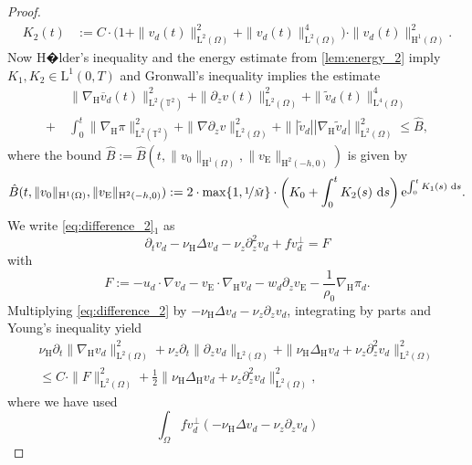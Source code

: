 \documentclass[preprint]{elsarticle}
\numberwithin{equation}{section}
\newcommand {\T}	{\mathbb{T}}
\renewcommand{\d}{\, \mathrm{d}}
\renewcommand{\H}{\mathrm{H}}
\newcommand{\dk}[1]{\partial_{#1}}
\newcommand{\dz}{\dk{z}}
\renewcommand{\bar}[1]{\overline{#1}}
\newcommand{\vbar}{\bar{v}}
\newcommand{\vtilde}{\tilde{v}}
\newcommand{\nablaH}{\nabla_{\H}}
\newcommand{\DeltaH}{\Delta_{\H}}
\newcommand{\rL}{\mathrm{L}}
\newcommand{\rH}{\H}
\newcommand{\rE}{\mathrm{E}}
\begin{document}
\begin{proof}
\begin{align*}
		K_2(t) &:= C \cdot \bigl(1+ \| v_d(t) \|_{\rL^2(\Omega)}^2 +\| v_d(t) \|_{\rL^2(\Omega)}^4\bigr) \cdot \| v_d(t) \|_{\rH^1(\Omega)}^2 .
	\end{align*}
	Now H�lder's inequality and the energy estimate from \autoref{lem:energy_2} imply $K_1, K_2 \in \rL^1(0,T)$ and Gronwall's inequality implies the estimate
	\begin{equation}
		\label{eq:bound_2}
		\begin{aligned}
			&\| \nablaH \vbar_d(t) \|_{\rL^2(\T^2)}^2
			+ \| \partial_z v(t) \|_{\rL^2(\Omega)}^2
			+ \| \vtilde_d(t) \|_{\rL^4(\Omega)}^4
			\\
			+ \
			&\int_0^t \| \nablaH \pi\|_{\rL^2(\T^2)}^2
			+ \| \nabla \partial_z v \|_{\rL^2(\Omega)}^2
			+ \| |\vtilde_d| |\nablaH \vtilde_d| \|_{\rL^2(\Omega)}^2 
			\leq \hat{B},  
		\end{aligned}
	\end{equation}
	where the bound $\hat{B} := \hat{B}(t,\| v_0 \|_{\rH^1(\Omega)},\|v_{\rE}\|_{\rH^2(-h,0)} )$ is given by
	\begin{equation*}
		\hat{B}(t,\| v_0 	\|_{\rH^1(\Omega)},\|v_{\rE}\|_{\rH^2(-h,0)} ) := 2 \cdot \max \{ 1, \nicefrac{1}{\tilde{M}} \} \cdot \left( K_0 + \int_0^t K_2(s) \, \d s \right)
		\mathrm{e}^{ \int_0^t K_1(s) \, \d s } .
	\end{equation*}
	We write \eqref{eq:difference_2}$_1$ as
	\begin{equation*}
		\partial_t v_d -\nu_{\rH}\Delta v_d-\nu_z\partial_z^2 v_d
		+ f v_d^\perp = F  
	\end{equation*}
	with
	\begin{equation*}
		F := - u_d \cdot \nabla v_d - v_{\rE} \cdot \nablaH v_d 
		- w_d \dz v_{\rE} - \frac{1}{\rho_0}\nablaH \pi_d.
	\end{equation*}
	Multiplying \eqref{eq:difference_2} by $-\nu_{\rH}\Delta v_d-\nu_z\partial_z v_d$, integrating by parts and Young's inequality yield  
	\begin{align*}
		\nu_{\rH} \partial_t \| \nablaH v_d \|_{\rL^2(\Omega)}^2
		+ \nu_z \partial_t \| \dz v_d \|_{\rL^2(\Omega)}
		+ \| \nu_{\rH}  \DeltaH v_d + \nu_z \partial_z^2 v_d\|_{\rL^2(\Omega)}^2		\\
		\leq C \cdot \| F \|_{\rL^2(\Omega)}^2
		+ \frac{1}{2} \| \nu_{\rH} \DeltaH v_d + \nu_z \partial_z^2 v_d\|_{\rL^2(\Omega)}^2,
	\end{align*}
	where we have used
	\begin{equation*}
		\int_{\Omega} f v_d^\perp (-\nu_{\rH}\Delta v_d-\nu_z\partial_z v_d)

\end{equation*}
\end{proof}
\end{document}
